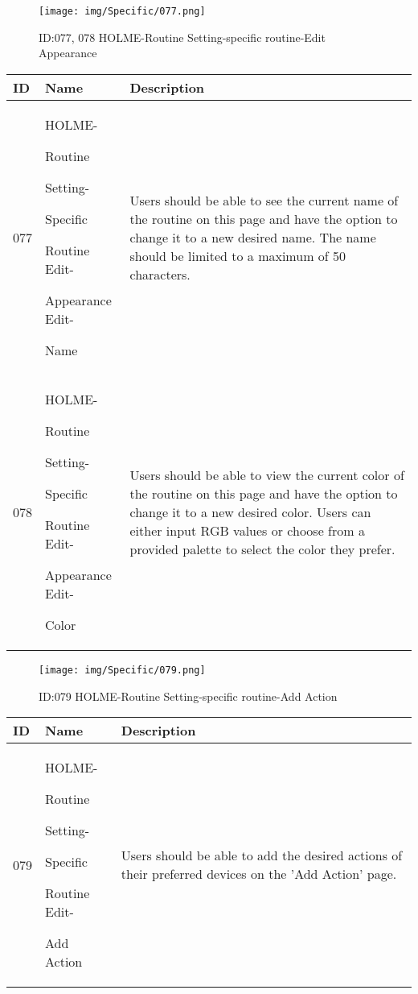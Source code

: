 \documentclass[conference]{IEEEtran}
\begin{document}
\begin{enumerate}
\begin{figure}[h]
\centering                                         
\texttt{[image: img/Specific/077.png]}
\caption{ID:077, 078 HOLME-Routine Setting-specific routine-Edit Appearance}
\end{figure}
\begin{table}[h]
\def\arraystretch{1.2} \small
    \begin{tabular}{|p{1cm}|p{1.8cm}|p{5.0cm}|}
        \hline
        ID & Name & Description\\ \hline
         077  \par  & HOLME-\par Routine \par Setting- \par Specific  \par Routine Edit- \par Appearance Edit- \par Name & 
         Users should be able to see the current name of the routine on this page and have the option to change it to a new desired name. The name should be limited to a maximum of 50 characters.
         \\ \hline
         078  \par  & HOLME-\par Routine \par Setting- \par Specific  \par Routine Edit- \par Appearance Edit- \par Color & 
        Users should be able to view the current color of the routine on this page and have the option to change it to a new desired color. Users can either input RGB values or choose from a provided palette to select the color they prefer.
         \\ \hline
    \end{tabular}
\end{table}

\begin{figure}[h]
\centering                                         
\texttt{[image: img/Specific/079.png]}
\caption{ID:079 HOLME-Routine Setting-specific routine-Add Action}
\end{figure}
\begin{table}[h]
\def\arraystretch{1.2} \small
    \begin{tabular}{|p{1cm}|p{1.8cm}|p{5.0cm}|}
        \hline
        ID & Name & Description\\ \hline
         079 \par  & HOLME-\par Routine \par Setting- \par Specific  \par Routine Edit- \par Add Action & 
         Users should be able to add the desired actions of their preferred devices on the 'Add Action' page.
         \\ \hline
    \end{tabular}
\end{table}


\end{enumerate}
\end{document}
